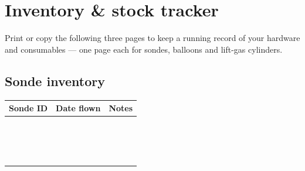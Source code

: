 \documentclass[11pt,openany]{report}
\begin{document}
\clearpage
\section{Inventory \& stock tracker}
Print or copy the following three pages to keep a running record of your hardware and
consumables --- one page each for sondes, balloons and lift-gas cylinders.

\clearpage
\subsection*{Sonde inventory}
{\renewcommand{\arraystretch}{2.6}\small
\begin{tabularx}{\textwidth}{|>{\raggedright\arraybackslash}p{3.2cm}|>{\raggedright\arraybackslash}p{3.2cm}|X|}
\hline
\rowcolor{tlorange!22}
\textbf{Sonde ID} & \textbf{Date flown} & \textbf{Notes} \\ \hline
 & & \\ \hline
 & & \\ \hline
 & & \\ \hline
 & & \\ \hline
 & & \\ \hline
 & & \\ \hline
 & & \\ \hline
 & & \\ \hline
 & & \\ \hline
 & & \\ \hline
 & & \\ \hline
 & & \\ \hline
 & & \\ \hline
 & & \\ \hline
 & & \\ \hline
 & & \\ \hline
\end{tabularx}}

\clearpage
\end{document}
